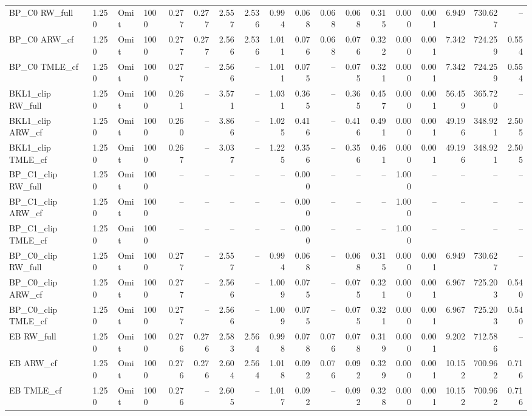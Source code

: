 \begin{tabular}{llllrrrrrrrrrrrrrr}
BP\_C0 RW\_full & 1.250 & Omit & 1000 & 0.277 & 0.277 & 2.557 & 2.536 & 0.994 & 0.068 & 0.068 & 0.068 & 0.315 & 0.000 & 0.001 & 6.949 & 730.627 & -- \\
BP\_C0 ARW\_cf & 1.250 & Omit & 1000 & 0.277 & 0.277 & 2.566 & 2.536 & 1.011 & 0.076 & 0.068 & 0.076 & 0.322 & 0.000 & 0.001 & 7.342 & 724.259 & 0.554 \\
BP\_C0 TMLE\_cf & 1.250 & Omit & 1000 & 0.277 & -- & 2.566 & -- & 1.011 & 0.075 & -- & 0.075 & 0.321 & 0.000 & 0.001 & 7.342 & 724.259 & 0.554 \\
BKL1\_clip RW\_full & 1.250 & Omit & 1000 & 0.261 & -- & 3.571 & -- & 1.031 & 0.365 & -- & 0.365 & 0.457 & 0.000 & 0.001 & 56.459 & 365.720 & -- \\
BKL1\_clip ARW\_cf & 1.250 & Omit & 1000 & 0.260 & -- & 3.866 & -- & 1.025 & 0.416 & -- & 0.416 & 0.491 & 0.000 & 0.001 & 49.196 & 348.921 & 2.505 \\
BKL1\_clip TMLE\_cf & 1.250 & Omit & 1000 & 0.267 & -- & 3.037 & -- & 1.225 & 0.356 & -- & 0.356 & 0.461 & 0.000 & 0.001 & 49.196 & 348.921 & 2.505 \\
BP\_C1\_clip RW\_full & 1.250 & Omit & 1000 & -- & -- & -- & -- & -- & 0.000 & -- & -- & -- & 1.000 & -- & -- & -- & -- \\
BP\_C1\_clip ARW\_cf & 1.250 & Omit & 1000 & -- & -- & -- & -- & -- & 0.000 & -- & -- & -- & 1.000 & -- & -- & -- & -- \\
BP\_C1\_clip TMLE\_cf & 1.250 & Omit & 1000 & -- & -- & -- & -- & -- & 0.000 & -- & -- & -- & 1.000 & -- & -- & -- & -- \\
BP\_C0\_clip RW\_full & 1.250 & Omit & 1000 & 0.277 & -- & 2.557 & -- & 0.994 & 0.068 & -- & 0.068 & 0.315 & 0.000 & 0.001 & 6.949 & 730.627 & -- \\
BP\_C0\_clip ARW\_cf & 1.250 & Omit & 1000 & 0.277 & -- & 2.566 & -- & 1.009 & 0.075 & -- & 0.075 & 0.321 & 0.000 & 0.001 & 6.967 & 725.203 & 0.540 \\
BP\_C0\_clip TMLE\_cf & 1.250 & Omit & 1000 & 0.277 & -- & 2.566 & -- & 1.009 & 0.075 & -- & 0.075 & 0.321 & 0.000 & 0.001 & 6.967 & 725.203 & 0.540 \\
EB RW\_full & 1.250 & Omit & 1000 & 0.276 & 0.276 & 2.583 & 2.564 & 0.998 & 0.078 & 0.076 & 0.078 & 0.319 & 0.000 & 0.001 & 9.202 & 712.586 & -- \\
EB ARW\_cf & 1.250 & Omit & 1000 & 0.276 & 0.276 & 2.604 & 2.564 & 1.018 & 0.092 & 0.076 & 0.092 & 0.329 & 0.000 & 0.001 & 10.152 & 700.962 & 0.716 \\
EB TMLE\_cf & 1.250 & Omit & 1000 & 0.276 & -- & 2.605 & -- & 1.017 & 0.092 & -- & 0.092 & 0.328 & 0.000 & 0.001 & 10.152 & 700.962 & 0.716 \\

\end{tabular}
